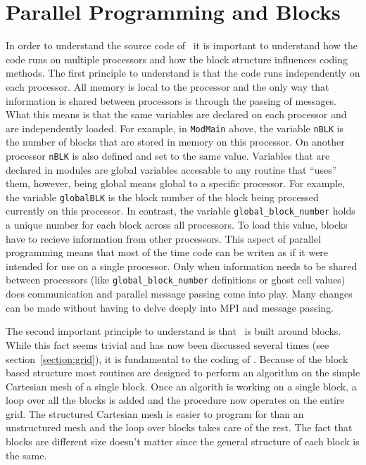 \section{Parallel Programming and Blocks \label{section:parallel_programming}}

In order to understand the source code of \BATSRUS\
it is important to understand how the code runs on
multiple processors and how the block structure influences
coding methods.  The first principle to understand is
that the code runs independently on each processor.  All memory
is local to the processor and the only way that information is
shared between processors is through the passing of messages.
What this means is that the same variables are declared on each
processor and are independently loaded.  For example, in 
{\tt ModMain} above, the variable {\tt nBLK} is the number of
blocks that are stored in memory on this processor.  On another
processor {\tt nBLK} is also defined and set to the same value.
Variables that are declared in modules are global variables 
accesable to any routine that ``uses'' them, however, being
global means global to a specific processor.  For example,
the variable {\tt globalBLK} is the block number of the 
block being processed currently on this processor.  In contrast,
the variable {\tt global\_block\_number} holds a unique number for
each block across all processors.  To
load this value, blocks have to recieve information from other
processors.  This aspect of parallel programming means that 
most of the time code can be writen as if it were intended
for use on a single processor.  Only when information needs to
be shared between processors (like
{\tt global\_block\_number} definitions or ghost cell values) does 
communication and parallel message passing come into play.
Many changes can be made without having to 
delve deeply into MPI and message passing.

The second important principle to understand is that \BATSRUS\
is built around blocks.  While this fact seems trivial
and has now been discussed several times (see section~\ref{section:grid}),
it is fundamental to the coding of \BATSRUS.  Because of the block 
based structure most routines are designed to perform an algorithm
on the simple Cartesian mesh of a single block.  Once an algorith is
 working on a single block, a loop over all the blocks is added and the
procedure now operates on the entire grid.  The structured
Cartesian mesh is easier to program for than an unstructured
mesh and the loop over blocks takes care of the rest.  The
fact that blocks are different size doesn't matter since the
general structure of each block is the same.


